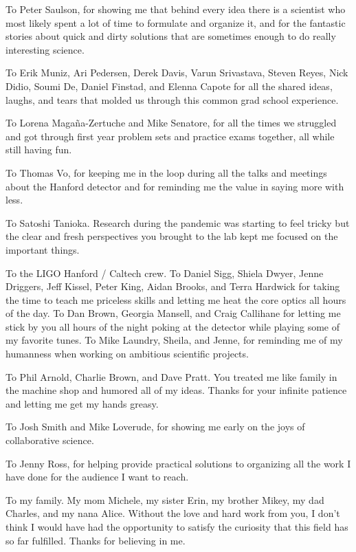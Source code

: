 \documentclass[12pt]{report}
\begin{document}
To Peter Saulson, for showing me that behind every idea there is a scientist who most likely spent a lot of time to formulate and organize it, and for the fantastic stories about quick and dirty solutions that are sometimes enough to do really interesting science.

To Erik Muniz, Ari Pedersen, Derek Davis, Varun Srivastava, Steven Reyes, Nick Didio, Soumi De, Daniel Finstad, and Elenna Capote for all the shared ideas, laughs, and tears that molded us through this common grad school experience. 

To Lorena Magaña-Zertuche and Mike Senatore, for all the times we struggled and got through first year problem sets and practice exams together, all while still having fun. 

To Thomas Vo, for keeping me in the loop during all the talks and meetings about the Hanford detector and for reminding me the value in saying more with less. 

To Satoshi Tanioka. Research during the pandemic was starting to feel tricky but the clear and fresh perspectives you brought to the lab kept me focused on the important things.

To the LIGO Hanford / Caltech crew. To Daniel Sigg, Shiela Dwyer, Jenne Driggers, Jeff Kissel, Peter King, Aidan Brooks, and Terra Hardwick for taking the time to teach me priceless skills and letting me heat the core optics all hours of the day. To Dan Brown, Georgia Mansell, and Craig Callihane for letting me stick by you all hours of the night poking at the detector while playing some of my favorite tunes. To Mike Laundry, Sheila, and Jenne, for reminding me of my humanness when working on ambitious scientific projects.

To Phil Arnold, Charlie Brown, and Dave Pratt. You treated me like family in the machine shop and humored all of my ideas. Thanks for your infinite patience and letting me get my hands greasy.

To Josh Smith and Mike Loverude, for showing me early on the joys of collaborative science.

To Jenny Ross, for helping provide practical solutions to organizing all the work I have done for the audience I want to reach. 

To my family. My mom Michele, my sister Erin, my brother Mikey, my dad Charles, and my nana Alice. Without the love and hard work from you, I don’t think I would have had the opportunity to satisfy the curiosity that this field has so far fulfilled. Thanks for believing in me.
\end{document}
